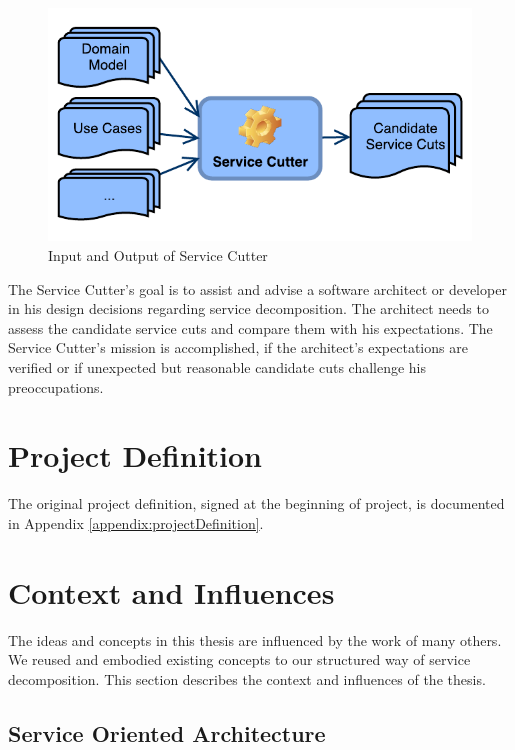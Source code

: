 \begin{figure}[H]
	\begin{center}
		\includegraphics[scale=1.1]{diagrams/systemContextDiagram.pdf}
	\end{center}
	\caption{Input and Output of Service Cutter}
	\label{fig:serviceCutterIO}
\end{figure}



The Service Cutter's goal is to assist and advise a software architect or developer in his design decisions regarding service decomposition. The architect needs to assess the candidate service cuts and compare them with his expectations. The Service Cutter's mission is accomplished, if the architect's expectations are verified or if unexpected but reasonable candidate cuts challenge his preoccupations. 

\section{Project Definition}

The original project definition, signed at the beginning of project, is documented in Appendix \ref{appendix:projectDefinition}.

\section{Context and Influences}

The ideas and concepts in this thesis are influenced by the work of many others. We reused and embodied existing concepts to our structured way of service decomposition. This section describes the context and influences of the thesis.

\subsection{Service Oriented Architecture}

